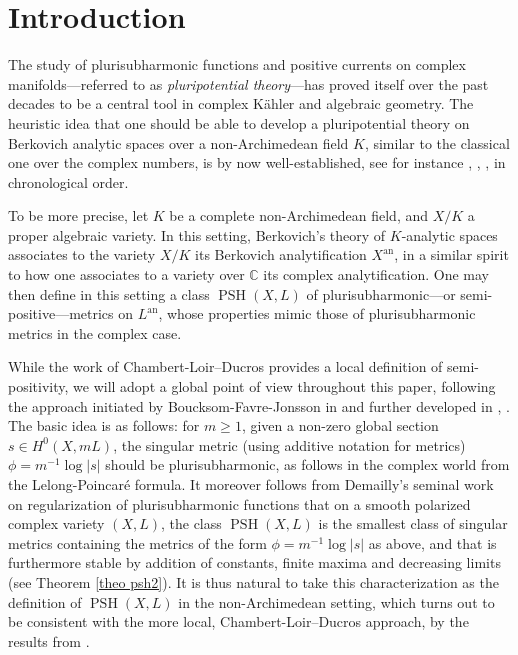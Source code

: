 \documentclass[JEP,XML,SOM,Unicode,published]{cedram}
\theoremstyle{definition}
\newcommand \C{\mathbb C}
\newcommand{\an}{\mathrm{an}}
\DeclareMathOperator{\PSH}{PSH}
\begin{document}
\section*{Introduction}
The study of plurisubharmonic functions and positive currents on complex manifolds---referred to as \emph{pluripotential theory}---has proved itself over the past decades to be a central tool in complex Kähler and algebraic geometry. The heuristic idea that one should be able to develop a pluripotential theory on Berkovich analytic spaces over a non-Archimedean field $K$, similar to the classical one over the complex numbers, is by now well-established, see for instance \cite{Thu2}, \cite{CLD} \cite{BFJ2}, \cite{BE}, \cite{BJv4} in chronological order.

To be more precise, let $K$ be a complete non-Archimedean field, and $X/K$ a proper algebraic variety. In this setting, Berkovich's theory of $K$-analytic spaces \cite{Ber} associates to the variety $X/K$ its Berkovich analytification $X^{\an}$, in a similar spirit to how one associates to a variety over $\C$ its complex analytification. One may then define in this setting a class $\PSH(X,L)$ of plurisubharmonic---or semi-positive---metrics on $L^{\an}$, whose properties mimic those of plurisubharmonic metrics in the complex case.

While the work of Chambert-Loir--Ducros \cite{CLD} provides a local definition of semi-positivity, we will adopt a global point of view throughout this paper, following the approach initiated by Boucksom-Favre-Jonsson in \cite{BFJ2} and further developed in \cite{BJtriv}, \cite{BJv4}. The basic idea is as follows: for $m \ge 1$, given a non-zero global section $s \in H^0(X, mL)$, the singular metric (using additive notation for metrics) $\phi = m^{-1} \log \lvert s \rvert$ should be plurisubharmonic, as follows in the complex world from the Lelong-Poincaré formula. It moreover follows from Demailly's seminal work \cite{Dem} on regularization of plurisubharmonic functions that on a smooth polarized complex variety $(X, L)$, the class $\PSH(X,L)$ is the smallest class of singular metrics containing the metrics of the form $\phi = m^{-1} \log \lvert s \rvert$ as above, and that is furthermore stable by addition of constants, finite maxima and decreasing limits (see Theorem \ref{theo psh2}). It is thus natural to take this characterization as the definition of $\PSH(X, L)$ in the non-Archimedean setting, which turns out to be consistent with the more local, Chambert-Loir--Ducros approach, by the results from \cite{BE}.
\end{document}
